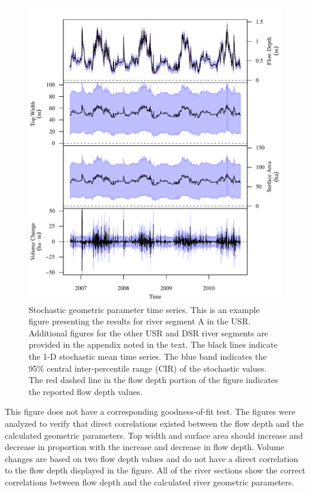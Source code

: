 \begin{linenumbers}
\begin{figure}[htbp]
\centering
	\includegraphics[width=6in]{"Figures/Results_USR/G TS A"}
	\caption[Stochastic geometric parameter time series.]{Stochastic geometric parameter time series.  This is an example figure presenting the results for river segment A in the USR.  Additional figures for the other USR and DSR river segments are provided in the appendix noted in the text.  The black lines indicate the 1-D stochastic mean time series.  The blue band indicates the 95\% central inter-percentile range (CIR) of the stochastic values.  The red dashed line in the flow depth portion of the figure indicates the reported flow depth values.}
	\label{fig:GeoTS}
\end{figure}

This figure does not have a corresponding goodness-of-fit test.  The figures were analyzed to verify that direct correlations existed between the flow depth and the calculated geometric parameters.  Top width and surface area should increase and decrease in proportion with the increase and decrease in flow depth.  Volume changes are based on two flow depth values and do not have a direct correlation to the flow depth displayed in the figure.  All of the river sections show the correct correlations between flow depth and the calculated river geometric parameters.


\end{linenumbers}
